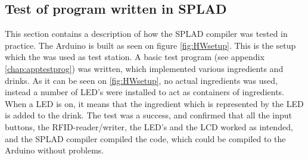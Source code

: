 \subsection{Test of program written in SPLAD}
This section contains a description of how the SPLAD compiler was tested in practice. The Arduino is built as seen on figure \ref{fig:HWsetup}. This is the setup which the was used as test station. A basic test program (see appendix \ref{chap:apptestprog}) was written, which implemented various ingredients and drinks. As it can be seen on \ref{fig:HWsetup}, no actual ingredients was used, instead a number of LED's were installed to act as containers of ingredients. When a LED is on, it means that the ingredient which is represented by the LED is added to the drink. The test was a success, and confirmed that all the input buttons, the RFID-reader/writer, the LED's and the LCD worked as intended, and the SPLAD compiler compiled the code, which could be compiled to the Arduino without problems.